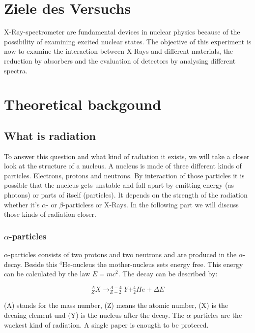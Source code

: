 \section{Ziele des Versuchs}
X-Ray-spectrometer are fundamental devices in nuclear physics because of the possibility of examining excited nuclear states. The objective of this experiment is now to examine the interaction between X-Rays and different materials, the reduction by absorbers and the evaluation of detectors by analysing different spectra.

\section{Theoretical backgound}

	\subsection{What is radiation}
	To answer this question and what kind of radiation it exists, we will take a closer look at the structure of a nucleus. A nucleus is made of three different kinds of particles. Electrons, protons and neutrons. By interaction of those particles it is possible that the nucleus gets unstable and fall apart by emitting energy (as photons) or parts of itself (particles). It depends on the strength of the radiation whether it's  $\alpha$- or $\beta$-particless or X-Rays. In the following part we will discuss those kinds of radiation closer.
\\

	\subsubsection*{$\alpha$-particles}
	$\alpha$-particles consists of two protons and two neutrons and are produced in the $\alpha$-decay. Beside this $^{4}$He-nucleus the mother-nucleus sets energy free. This energy can be calculated by the law $E=mc^{2}$. The decay can be described by:

	\begin{equation}
	^{A}_{Z}X \rightarrow ^{A-4}_{Z-2}Y + ^{4}_{2}He + \Delta E 
	\end{equation}

(A) stands for the mass number, (Z) means the atomic number, (X) is the decaing element und (Y) is the nucleus after the decay. The $\alpha$-particles are the waekest kind of radiation. A single paper is enougth to be proteced.

